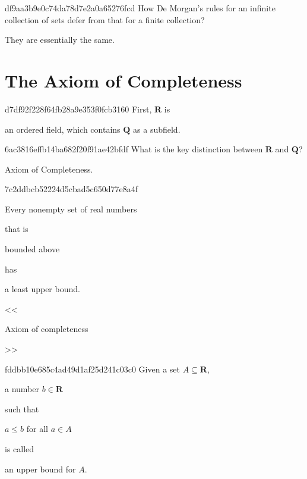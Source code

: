 \begin{note}{df9aa3b9e0c74da78d7e2a0a65276fcd}
    How De Morgan's rules for an infinite collection of sets defer from that for a finite collection?

    \begin{cloze}{1}
        They are essentially the same.
    \end{cloze}
\end{note}

\section{The Axiom of Completeness}
\begin{note}{d7df92f228f64fb28a9e353f0fcb3160}
    First, \({ \mathbf{R} }\) is \begin{icloze}{1}an ordered field, which contains \({ \mathbf{Q} }\) as a subfield.\end{icloze}
\end{note}

\begin{note}{6ac3816effb14ba682f20f91ae42bfdf}
    What is the key distinction between \({ \mathbf{R} }\) and \({ \mathbf{Q} }\)?

    \begin{cloze}{1}
        Axiom of Completeness.
    \end{cloze}
\end{note}

\begin{note}{7c2ddbcb52224d5cbad5c650d77e8a4f}
    \begin{icloze}{1}Every nonempty set of real numbers\end{icloze} that is \begin{icloze}{2}bounded above\end{icloze} has \begin{icloze}{3}a least upper bound.\end{icloze}

    \begin{center}
        \tiny
        <<\begin{icloze}{4}Axiom of completeness\end{icloze}>>
    \end{center}
\end{note}

\begin{note}{fddbb10e685c4ad49d1af25d241c03c0}
    Given a set \({ A \subseteq \mathbf{R} }\), \begin{icloze}{3}a number \({ b \in \mathbf{R} }\)\end{icloze} such that \begin{icloze}{2}\({ a \leq b }\) for all \({ a \in A }\)\end{icloze} is called \begin{icloze}{1}an upper bound for \({ A }\).\end{icloze}
\end{note}

